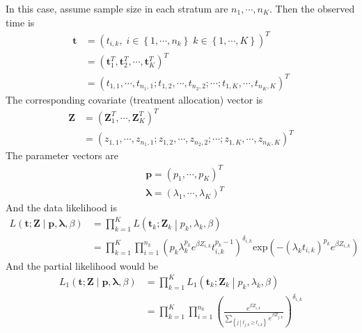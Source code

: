\documentclass[a4paper,12pt]{article}
\begin{document}
In this case, assume sample size in each stratum are $n_1, \cdots, n_K$. Then the observed time is
\[
  \begin{aligned}
    \bm{t}
    &=
      \left(
      t_{i,k}
      ,\;
      i\in\left\{1, \cdots, n_k\right\}
      \;
      k\in\left\{1, \cdots, K\right\}
      \right)^T    \\
    &= \left(
      \bm{t}_1^T, \bm{t}_2^T, \cdots, \bm{t}_K^T
      \right)^T    \\
    &= \left(
      t_{1, 1}, \cdots, t_{n_1, 1};
      t_{1, 2}, \cdots, t_{n_2, 2};
      \cdots ;
      t_{1, K}, \cdots, t_{n_K, K}
      \right)^T
  \end{aligned} 
\]
The corresponding covariate (treatment allocation) vector is
\[
  \begin{aligned}
    \bm{Z}
    &= \left(
      \bm{Z}_1^T, \cdots, \bm{Z}_K^T
      \right)^T    \\
    &= \left(
      z_{1, 1}, \cdots, z_{n_1, 1};
      z_{1, 2}, \cdots, z_{n_2, 2};
      \cdots ;
      z_{1, K}, \cdots, z_{n_K, K}
      \right)^T
  \end{aligned}
\]
The parameter vectors are
\[
  \begin{aligned}
    & \bm{p} = \left(p_1, \cdots, p_K\right)^T    \\
    & \bm{\lambda} = \left(\lambda_1, \cdots, \lambda_K\right)^T
  \end{aligned}
\]
And the data likelihood is
\[
  \begin{aligned}
    L\left(
    \bm{t}; \bm{Z}
    \middle|
    \bm{p}, \bm{\lambda}, \beta
    \right)
    &= \prod\limits_{k = 1}^K
      L\left(\bm{t}_k; \bm{Z}_k\middle| p_k, \lambda_k, \beta\right)    \\
    &= \prod\limits_{k = 1}^K\prod\limits_{i = 1}^{n_k}
      \left(
      p_k\lambda_k^{p_k}e^{\beta Z_{i, k}}t_{i, k}^{p_k - 1}
      \right)^{\delta_{i, k}}
      \mathrm{exp}\left(
      - \left(\lambda_k t_{i, k}\right)^{p_k}
      e^{\beta Z_{i, k}}
      \right)
  \end{aligned}
\]
And the partial likelihood would be
\[
  \begin{aligned}
    L_1\left(\bm{t}; \bm{Z}\middle|\bm{p}, \bm{\lambda}, \beta\right)
    &= \prod\limits_{k = 1}^KL_1\left(\bm{t}_k; \bm{Z}_k\middle| p_k, \lambda_k, \beta\right)    \\
    &= \prod\limits_{k = 1}^K\prod\limits_{i = 1}^{n_k}
      \left(
      \frac{
      e^{\beta Z_{i, k}}}{
      \sum\limits_{\left\{j\middle|t_{j, k}\geq t_{i, k}\right\}}e^{\beta Z_{j, k}}}
      \right)^{\delta_{i, k}}
  \end{aligned}
\]
\end{document}
